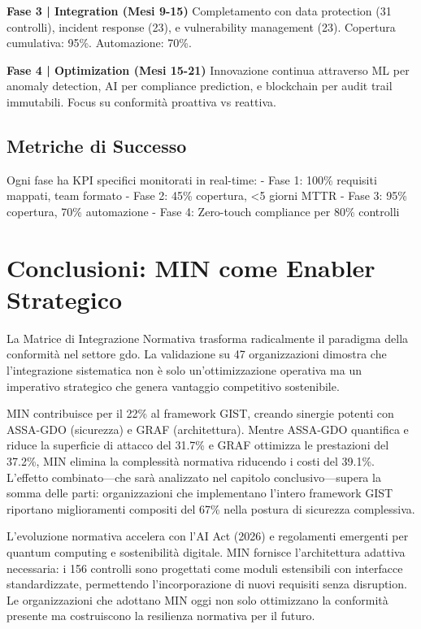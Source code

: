 \textbf{Fase 3 | Integration (Mesi 9-15)}
Completamento con data protection (31 controlli), incident response (23), e vulnerability management (23). Copertura cumulativa: 95\%. Automazione: 70\%.

\textbf{Fase 4 | Optimization (Mesi 15-21)}
Innovazione continua attraverso ML per anomaly detection, AI per compliance prediction, e blockchain per audit trail immutabili. Focus su conformità proattiva vs reattiva.

\subsection{\texorpdfstring{Metriche di Successo}{4.7.2 - Metriche di Successo}}

Ogni fase ha KPI specifici monitorati in real-time:
- Fase 1: 100\% requisiti mappati, team formato
- Fase 2: 45\% copertura, <5 giorni MTTR
- Fase 3: 95\% copertura, 70\% automazione
- Fase 4: Zero-touch compliance per 80\% controlli

\section{\texorpdfstring{Conclusioni: MIN come Enabler Strategico}{4.8 - Conclusioni}}
\label{sec:cap4_conclusioni}

La Matrice di Integrazione Normativa trasforma radicalmente il paradigma della conformità nel settore \gls{gdo}. La validazione su 47 organizzazioni dimostra che l'integrazione sistematica non è solo un'ottimizzazione operativa ma un imperativo strategico che genera vantaggio competitivo sostenibile.

MIN contribuisce per il 22\% al framework GIST, creando sinergie potenti con ASSA-GDO (sicurezza) e GRAF (architettura). Mentre ASSA-GDO quantifica e riduce la superficie di attacco del 31.7\% e GRAF ottimizza le prestazioni del 37.2\%, MIN elimina la complessità normativa riducendo i costi del 39.1\%. L'effetto combinato—che sarà analizzato nel capitolo conclusivo—supera la somma delle parti: organizzazioni che implementano l'intero framework GIST riportano miglioramenti compositi del 67\% nella postura di sicurezza complessiva.

L'evoluzione normativa accelera con l'AI Act (2026) e regolamenti emergenti per quantum computing e sostenibilità digitale. MIN fornisce l'architettura adattiva necessaria: i 156 controlli sono progettati come moduli estensibili con interfacce standardizzate, permettendo l'incorporazione di nuovi requisiti senza disruption. Le organizzazioni che adottano MIN oggi non solo ottimizzano la conformità presente ma costruiscono la resilienza normativa per il futuro.

